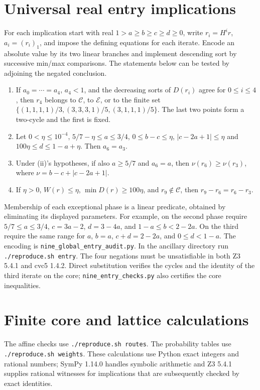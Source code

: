 \documentclass[11pt,reqno]{amsart}
\newcommand{\runcheck}[1]{\texttt{./reproduce.sh\ #1}}
\newcommand{\file}[1]{\nolinkurl{#1}}
\begin{document}
\section{Universal real entry implications}\label{app:entry}
For each implication start with real $1>a\ge b\ge c\ge d\ge0$,
write $r_i=H^ir$, $a_i=(r_i)_1$, and impose the defining equations for
each iterate. Encode an absolute value by its two linear
branches and implement descending sort by successive min/max comparisons.
The statements below can be tested by adjoining the negated conclusion.
\begin{enumerate}
\item[(i)] If $a_0=\cdots=a_4$, $a_4<1$, and the decreasing sorts of
$D(r_i)$ agree for $0\le i\le4$, then $r_4$ belongs to $\mathcal C$,
to $\mathcal E$, or to the finite set
$\{(1,1,1,1)/3,(3,3,3,1)/5,(3,1,1,1)/5\}$.
The last two points form a two-cycle and the first is fixed.
\item[(ii)] Let $0<\eta\le10^{-4}$, $5/7-\eta\le a\le3/4$,
$0\le b-c\le\eta$, $|c-2a+1|\le\eta$ and
$100\eta\le d\le1-a+\eta$. Then $a_6=a_3$.
\item[(iii)] Under (ii)'s hypotheses, if also $a\ge5/7$ and $a_6=a$,
then $\nu(r_6)\ge\nu(r_3)$, where $\nu=b-c+|c-2a+1|$.
\item[(iv)] If $\eta>0$, $W(r)\le\eta$, $\min D(r)\ge100\eta$, and
$r_9\notin\mathcal C$, then $r_9-r_6=r_6-r_3$.
\end{enumerate}
Membership of each exceptional phase is a linear predicate, obtained
by eliminating its displayed parameters. For example, on the second
phase require $5/7\le a\le3/4$, $c=3a-2$, $d=3-4a$, and
$1-a\le b<2-2a$. On the third require the same range for $a$,
$b=a$, $c+d=2-2a$, and $0\le d<1-a$.
The encoding is \file{nine_global_entry_audit.py}. In the ancillary
directory run \runcheck{entry}. The four negations must be
unsatisfiable in both Z3 5.4.1 and cvc5 1.4.2. Direct substitution
verifies the cycles and the identity of the third iterate on the core;
\file{nine_entry_checks.py} also certifies the core inequalities.

\section{Finite core and lattice calculations}\label{app:routes}
The affine checks use \runcheck{routes}. The probability tables use
\runcheck{weights}. These calculations
use Python exact integers and rational numbers; SymPy 1.14.0 handles
symbolic arithmetic and Z3 5.4.1 supplies rational witnesses for
implications that are subsequently checked by exact identities.
\end{document}
